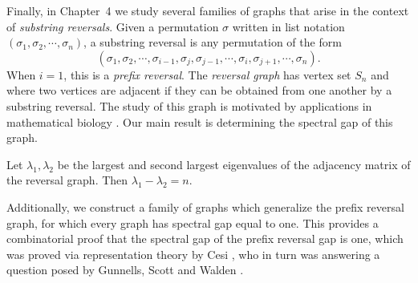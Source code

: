 Finally, in Chapter~4 we study several families of graphs that arise in the context
of \textit{substring reversals}.  Given a permutation $\sigma$ written in list notation
$(\sigma_1, \sigma_2, \cdots, \sigma_n)$, a substring reversal is any permutation
of the form
\[ (\sigma_1, \sigma_2, \cdots, \sigma_{i-1}, \sigma_j, \sigma_{j-1}, \cdots, \sigma_{i}, \sigma_{j+1}, \cdots, \sigma_n) .\]
When $i = 1$, this is a \textit{prefix reversal}.  The \textit{reversal graph} has vertex set $S_n$
and where two vertices are adjacent if they can be obtained from one another by a substring reversal.
The study of this graph is motivated by applications in mathematical biology \cite{BafnaPevzner1996}.
Our main result is determining the spectral gap of this graph.
\begin{theorem}
  Let $\lambda_1, \lambda_2$ be the largest and second largest eigenvalues
  of the adjacency matrix of the reversal graph.  Then $\lambda_1 - \lambda_2 = n$.
\end{theorem}
Additionally, we construct a family of graphs which generalize the prefix reversal graph,
for which every graph has spectral gap equal to one.  This provides a combinatorial
proof that the spectral gap of the prefix reversal gap is one, which was proved via
representation theory by Cesi \cite{Cesi2009}, who in turn was answering a question
posed by Gunnells, Scott and Walden \cite{GunnellsEtAl2007}.











